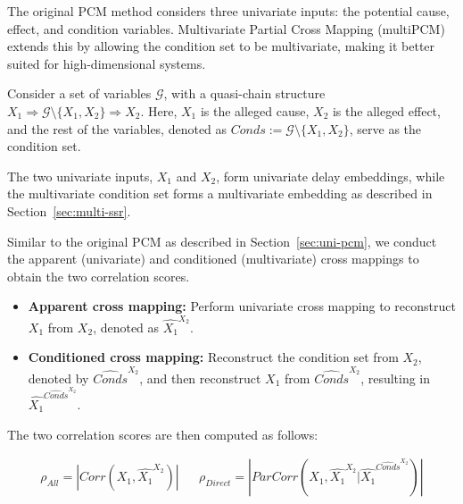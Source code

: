 The original PCM method considers three univariate inputs: the potential cause, effect, and condition variables. Multivariate Partial Cross Mapping (multiPCM) extends this by allowing the condition set to be multivariate, making it better suited for high-dimensional systems.

Consider a set of variables $\mathcal{G}$, with a quasi-chain structure $X_1 \Rightarrow \mathcal{G} \setminus {\{X_1, X_2\}} \Rightarrow X_2$. Here, $X_1$ is the alleged cause, $X_2$ is the alleged effect, and the rest of the variables, denoted as $\textit{Conds} := \mathcal{G} \setminus {\{X_1, X_2\}}$, serve as the condition set.

The two univariate inputs, $X_1$ and $X_2$, form univariate delay embeddings, while the multivariate condition set forms a multivariate embedding as described in Section~\ref{sec:multi-ssr}.

Similar to the original PCM as described in Section~\ref{sec:uni-pcm}, we conduct the apparent (univariate) and conditioned (multivariate) cross mappings to obtain the two correlation scores. 

\begin{itemize}
    \item \textbf{Apparent cross mapping:} Perform univariate cross mapping to reconstruct $X_1$ from $X_2$, denoted as $\hat{X_1}^{X_2}$.
    \item \textbf{Conditioned cross mapping:} Reconstruct the condition set from $X_2$, denoted by $\widehat{\textit{Conds}}^{X_2}$, and then reconstruct $X_1$ from $\widehat{\textit{Conds}}^{X_2}$, resulting in $\hat{X_1}^{\widehat{\textit{Conds}}^{X_2}}$.
\end{itemize}


The two correlation scores are then computed as follows:


\begin{align}
    \rho_{All}=\left| Corr(X_1, \hat{X_1}^{X_2}) \right| &&  \rho_{Direct}=\left| ParCorr(X_1, \hat{X_1}^{X_2} | {\hat{X_1}^{\widehat{\textit{Conds}}^{X_2}}} ) \right|
\end{align}


